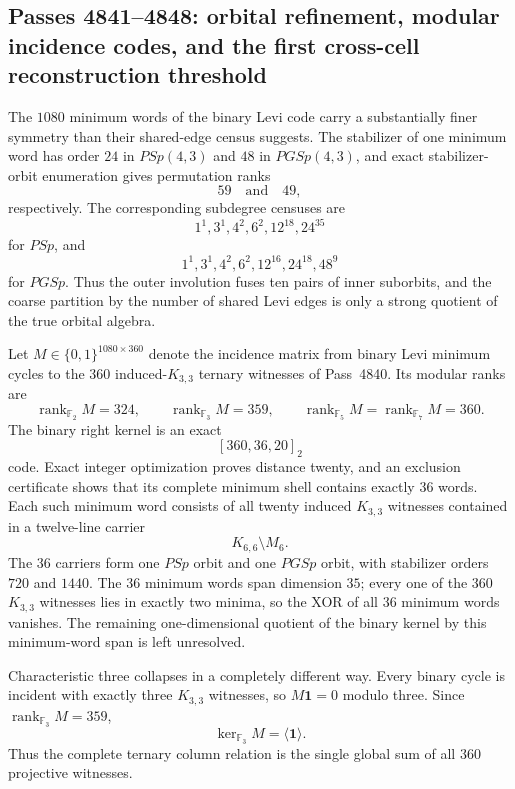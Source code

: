 \subsection{Passes 4841--4848: orbital refinement, modular incidence codes, and the first cross-cell reconstruction threshold}
\label{subsec:pass4841-4848}

The $1080$ minimum words of the binary Levi code carry a substantially finer symmetry than their shared-edge census suggests.  The stabilizer of one minimum word has order $24$ in $PSp(4,3)$ and $48$ in $PGSp(4,3)$, and exact stabilizer-orbit enumeration gives permutation ranks
\[
\boxed{59\quad\text{and}\quad49},
\]
respectively.  The corresponding subdegree censuses are
\[
1^1,3^1,4^2,6^2,12^{18},24^{35}
\]
for $PSp$, and
\[
1^1,3^1,4^2,6^2,12^{16},24^{18},48^9
\]
for $PGSp$.  Thus the outer involution fuses ten pairs of inner suborbits, and the coarse partition by the number of shared Levi edges is only a strong quotient of the true orbital algebra.

Let $M\in\{0,1\}^{1080\times360}$ denote the incidence matrix from binary Levi minimum cycles to the $360$ induced-$K_{3,3}$ ternary witnesses of Pass~4840.  Its modular ranks are
\[
\operatorname{rank}_{\mathbb F_2}M=324,
\qquad
\operatorname{rank}_{\mathbb F_3}M=359,
\qquad
\operatorname{rank}_{\mathbb F_5}M=\operatorname{rank}_{\mathbb F_7}M=360.
\]
The binary right kernel is an exact
\[
\boxed{[360,36,20]_2}
\]
code.  Exact integer optimization proves distance twenty, and an exclusion certificate shows that its complete minimum shell contains exactly $36$ words.  Each such minimum word consists of all twenty induced $K_{3,3}$ witnesses contained in a twelve-line carrier
\[
\boxed{K_{6,6}\setminus M_6}.
\]
The $36$ carriers form one $PSp$ orbit and one $PGSp$ orbit, with stabilizer orders $720$ and $1440$.  The $36$ minimum words span dimension $35$; every one of the $360$ $K_{3,3}$ witnesses lies in exactly two minima, so the XOR of all $36$ minimum words vanishes.  The remaining one-dimensional quotient of the binary kernel by this minimum-word span is left unresolved.

Characteristic three collapses in a completely different way.  Every binary cycle is incident with exactly three $K_{3,3}$ witnesses, so $M\mathbf 1=0$ modulo three.  Since $\operatorname{rank}_{\mathbb F_3}M=359$,
\[
\boxed{\ker_{\mathbb F_3}M=\langle\mathbf 1\rangle}.
\]
Thus the complete ternary column relation is the single global sum of all $360$ projective witnesses.

